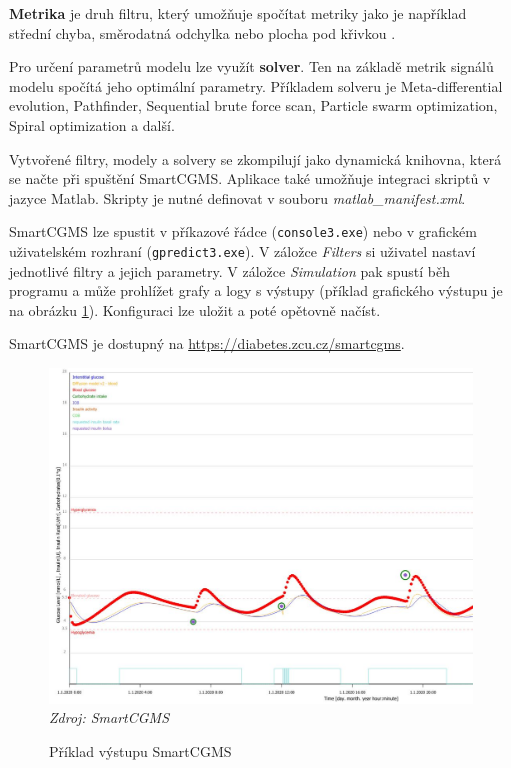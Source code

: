 \textbf{Metrika} je druh filtru, který umožňuje spočítat metriky jako je například střední chyba, směrodatná odchylka nebo plocha pod křivkou \citep{cgms.koutny}.

Pro určení parametrů modelu lze využít \textbf{solver}. Ten na základě metrik signálů modelu spočítá jeho optimální parametry. Příkladem solveru je Meta-differential evolution, Pathfinder, Sequential brute force scan, Particle swarm optimization, Spiral optimization a další.

Vytvořené filtry, modely a solvery se zkompilují jako dynamická knihovna, která se načte při spuštění SmartCGMS. Aplikace také umožňuje integraci skriptů v jazyce Matlab. Skripty je nutné definovat v souboru \textit{matlab\_manifest.xml}.

SmartCGMS lze spustit v příkazové řádce (\texttt{console3.exe}) nebo v grafickém uživatelském rozhraní (\texttt{gpredict3.exe}). V záložce \textit{Filters} si uživatel nastaví jednotlivé filtry a jejich parametry. V záložce \textit{Simulation} pak spustí běh programu a může prohlížet grafy a logy s výstupy (příklad grafického výstupu je na obrázku \ref{fig:scgms_graf}). Konfiguraci lze uložit a poté opětovně načíst.

SmartCGMS je dostupný na \url{https://diabetes.zcu.cz/smartcgms}.

\begin{figure}[H]
\caption{Příklad výstupu SmartCGMS}
\label{fig:scgms_graf}
\centering
\includegraphics[width=1\textwidth]{img/scgms/graf1.jpg}
\textit{Zdroj: SmartCGMS}
\end{figure}